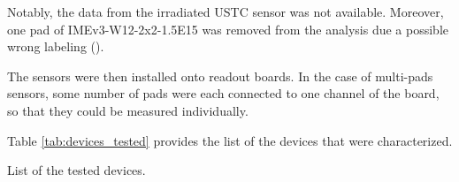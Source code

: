 Notably, the data from the irradiated USTC sensor was not available. Moreover, one pad of IMEv3-W12-2x2-1.5E15 was removed from the analysis due a possible wrong labeling ().

The sensors were then installed onto readout boards. In the case of multi-pads sensors, some number of pads were each connected to one channel of the board, so that they could be measured individually.

Table \ref{tab:devices_tested} provides the list of the devices that were characterized.


\begin{table}[h!tbpt]  
    \centering
    \captionsetup{width=\captionwidth}
    \caption{List of the tested devices.}
    \label{tab:devices_tested}


\end{table}

